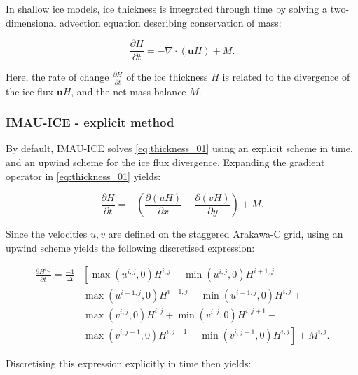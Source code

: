 \documentclass{article}
\begin{document}
In shallow ice models, ice thickness is integrated through time by solving a two-dimensional advection equation describing conservation of mass:

\begin{equation} \label{eq:thickness_01}
\frac{\partial H}{\partial t} = -\nabla \cdot \left( \textbf{u} H \right) + M.
\end{equation}

Here, the rate of change $\frac{\partial H}{\partial t}$ of the ice thickness $H$ is related to the divergence of the ice flux $\textbf{u} H$, and the net mass balance $M$.

\subsubsection{IMAU-ICE - explicit method}

By default, IMAU-ICE solves \eqref{eq:thickness_01} using an explicit scheme in time, and an upwind scheme for the ice flux divergence. Expanding the gradient operator in \eqref{eq:thickness_01} yields:

\begin{equation} \label{eq:thickness_02}
\frac{\partial H}{\partial t} = -\left( \frac{\partial \left( u H\right) }{\partial x} + \frac{\partial \left( v H\right) }{\partial y} \right) + M.
\end{equation}

Since the velocities $u,v$ are defined on the staggered Arakawa-C grid, using an upwind scheme yields the following discretised expression:

\begin{equation} \label{eq:thickness_03}
\begin{split}
\frac{\partial H^{i,j}}{\partial t} = \frac{-1}{\Delta} & \left[ 
\max \left( u^{i,j},0 \right) H^{i,j} + \min \left( u^{i,j},0 \right) H^{i+1,j} \right. - \\
& \left. \max \left( u^{i-1,j},0 \right) H^{i-1,j} - \min \left( u^{i-1,j},0 \right) H^{i,j} \right. + \\
& \left. \max \left( v^{i,j},0 \right) H^{i,j} + \min \left( v^{i,j},0 \right) H^{i,j+1} \right. - \\
& \left. \max \left( v^{i,j-1},0 \right) H^{i,j-1} - \min \left( v^{i,j-1},0 \right) H^{i,j} \right]
+ M^{i,j}.
\end{split}
\end{equation}

Discretising this expression explicitly in time then yields:
\end{document}
